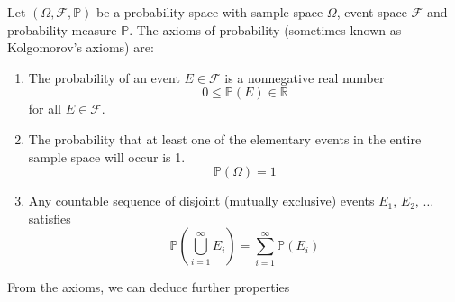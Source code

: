 \documentclass[11pt]{report} %
\begin{document}
Let $\left(\Omega, \mathcal{F}, \mathbb{P}\right)$ be a probability space with sample space $\Omega$, event space $\mathcal{F}$ and probability measure $\mathbb{P}$. The axioms of probability (sometimes known as Kolgomorov's axioms) are:
\begin{enumerate}
\item The probability of an event $E \in \mathcal{F}$ is a nonnegative real number
\begin{equation}
0 \leq \mathbb{P}\left(E\right) \in \mathbb{R}
\end{equation}
for all $E \in \mathcal{F}$.
\item The probability that at least one of the elementary events in the entire sample space will occur is 1.
\begin{equation}
\mathbb{P}\left(\Omega\right) = 1
\end{equation}
\item Any countable sequence of disjoint (mutually exclusive) events $E_{1}$, $E_{2}$, $\dots$ satisfies
\begin{equation}
\mathbb{P}\left(\bigcup_{i = 1}^{\infty}E_{i}\right) = \sum_{i = 1}^{\infty}\mathbb{P}\left(E_{i}\right)
\end{equation}
\end{enumerate}
From the axioms, we can deduce further properties
\end{document}
